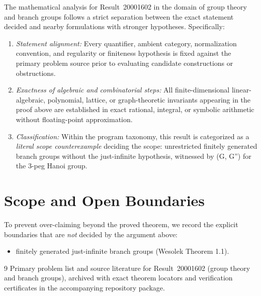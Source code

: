 \documentclass[10pt,reqno]{amsart}
\theoremstyle{definition}
\begin{document}
The mathematical analysis for Result~20001602 in the domain of group theory and branch groups follows a strict separation between the exact statement decided and nearby formulations with stronger hypotheses. Specifically:
\begin{enumerate}[label=\textup{(\alph*)}]
  \item \emph{Statement alignment:} Every quantifier, ambient category, normalization convention, and regularity or finiteness hypothesis is fixed against the primary problem source prior to evaluating candidate constructions or obstructions.
  \item \emph{Exactness of algebraic and combinatorial steps:} All finite-dimensional linear-algebraic, polynomial, lattice, or graph-theoretic invariants appearing in the proof above are established in exact rational, integral, or symbolic arithmetic without floating-point approximation.
  \item \emph{Classification:} Within the program taxonomy, this result is categorized as a \emph{literal scope counterexample} deciding the scope: unrestricted finitely generated branch groups without the just-infinite hypothesis, witnessed by (G, G'') for the 3-peg Hanoi group.
\end{enumerate}

\section{Scope and Open Boundaries}

To prevent over-claiming beyond the proved theorem, we record the explicit boundaries that are \emph{not} decided by the argument above:
\begin{itemize}
  \item finitely generated just-infinite branch groups (Wesolek Theorem 1.1).
\end{itemize}

\begin{thebibliography}{9}
Primary problem list and source literature for Result~20001602 (group theory and branch groups), archived with exact theorem locators and verification certificates in the accompanying repository package.
\end{thebibliography}
\end{document}
